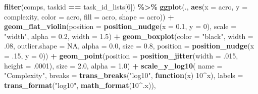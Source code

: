 \documentclass[
]{book}
\newenvironment{Shaded}{\begin{snugshade}}{\end{snugshade}}
\newcommand{\AttributeTok}[1]{\textcolor[rgb]{0.13,0.29,0.53}{#1}}
\newcommand{\ConstantTok}[1]{\textcolor[rgb]{0.56,0.35,0.01}{#1}}
\newcommand{\ControlFlowTok}[1]{\textcolor[rgb]{0.13,0.29,0.53}{\textbf{#1}}}
\newcommand{\DecValTok}[1]{\textcolor[rgb]{0.00,0.00,0.81}{#1}}
\newcommand{\FloatTok}[1]{\textcolor[rgb]{0.00,0.00,0.81}{#1}}
\newcommand{\FunctionTok}[1]{\textcolor[rgb]{0.13,0.29,0.53}{\textbf{#1}}}
\newcommand{\NormalTok}[1]{#1}
\newcommand{\SpecialCharTok}[1]{\textcolor[rgb]{0.81,0.36,0.00}{\textbf{#1}}}
\newcommand{\StringTok}[1]{\textcolor[rgb]{0.31,0.60,0.02}{#1}}
\begin{document}
\begin{Shaded}
\begin{Highlighting}[]
\FunctionTok{filter}\NormalTok{(comps, taskid }\SpecialCharTok{==}\NormalTok{ task\_id\_lists[}\DecValTok{6}\NormalTok{]) }\SpecialCharTok{\%\textgreater{}\%}
  \FunctionTok{ggplot}\NormalTok{(., }\FunctionTok{aes}\NormalTok{(}\AttributeTok{x =}\NormalTok{ acro, }\AttributeTok{y =}\NormalTok{ complexity, }\AttributeTok{color =}\NormalTok{ acro,}
                \AttributeTok{fill =}\NormalTok{ acro, }\AttributeTok{shape =}\NormalTok{ acro)) }\SpecialCharTok{+}
  \FunctionTok{geom\_flat\_violin}\NormalTok{(}\AttributeTok{position =} \FunctionTok{position\_nudge}\NormalTok{(}\AttributeTok{x =} \FloatTok{0.1}\NormalTok{, }\AttributeTok{y =} \DecValTok{0}\NormalTok{),}
                   \AttributeTok{scale =} \StringTok{"width"}\NormalTok{, }\AttributeTok{alpha =} \FloatTok{0.2}\NormalTok{, }\AttributeTok{width =} \FloatTok{1.5}\NormalTok{) }\SpecialCharTok{+}
  \FunctionTok{geom\_boxplot}\NormalTok{(}\AttributeTok{color =} \StringTok{"black"}\NormalTok{, }\AttributeTok{width =}\NormalTok{ .}\DecValTok{08}\NormalTok{, }\AttributeTok{outlier.shape =} \ConstantTok{NA}\NormalTok{, }\AttributeTok{alpha =} \FloatTok{0.0}\NormalTok{,}
               \AttributeTok{size =} \FloatTok{0.8}\NormalTok{, }\AttributeTok{position =} \FunctionTok{position\_nudge}\NormalTok{(}\AttributeTok{x =}\NormalTok{ .}\DecValTok{15}\NormalTok{, }\AttributeTok{y =} \DecValTok{0}\NormalTok{)) }\SpecialCharTok{+}
  \FunctionTok{geom\_point}\NormalTok{(}\AttributeTok{position =} \FunctionTok{position\_jitter}\NormalTok{(}\AttributeTok{width =}\NormalTok{ .}\DecValTok{015}\NormalTok{, }\AttributeTok{height =}\NormalTok{ .}\DecValTok{0001}\NormalTok{),}
             \AttributeTok{size =} \FloatTok{2.0}\NormalTok{, }\AttributeTok{alpha =} \FloatTok{1.0}\NormalTok{) }\SpecialCharTok{+}
  \FunctionTok{scale\_y\_log10}\NormalTok{(}
    \AttributeTok{name =} \StringTok{"Complexity"}\NormalTok{,}
    \AttributeTok{breaks =} \FunctionTok{trans\_breaks}\NormalTok{(}\StringTok{"log10"}\NormalTok{, }\ControlFlowTok{function}\NormalTok{(x) }\DecValTok{10}\SpecialCharTok{\^{}}\NormalTok{x),}
    \AttributeTok{labels =} \FunctionTok{trans\_format}\NormalTok{(}\StringTok{"log10"}\NormalTok{, }\FunctionTok{math\_format}\NormalTok{(}\DecValTok{10}\SpecialCharTok{\^{}}\NormalTok{.x)),}


\end{Highlighting}
\end{Shaded}
\end{document}
